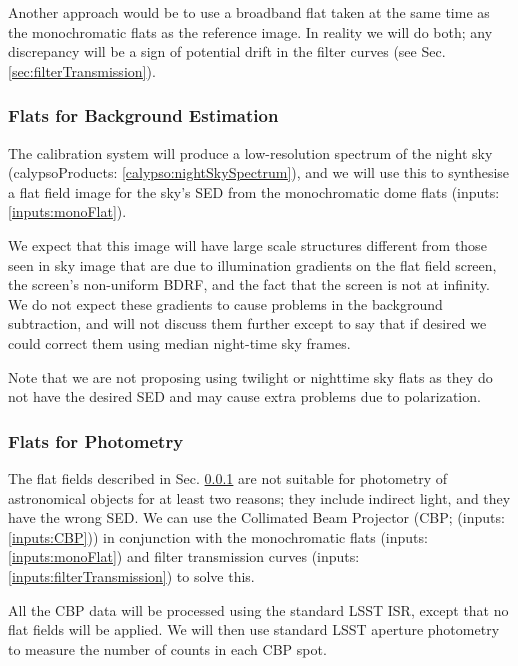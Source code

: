 \documentclass[12pt]{article}
\newcommand{\inputData}[1]{(inputs: \ref{inputs:#1})}
\newcommand{\calypsoData}[1]{(calypsoProducts: \ref{calypso:#1})}
\newcommand{\secRef}[1]{Sec. \ref{sec:#1}}
\begin{document}
Another approach would be to use a broadband flat taken at the same time as the monochromatic flats
as the reference image.  In reality we will do both;  any discrepancy will be a sign of potential
drift in the filter curves (see \secRef{filterTransmission}).

\subsubsection{Flats for Background Estimation}
\label{sec:backgroundFlats}

The calibration system will produce a low-resolution spectrum of the night sky \calypsoData{nightSkySpectrum},
and we will use this to synthesise a flat field image for the sky's SED from the monochromatic dome flats
\inputData{monoFlat}.

We expect that this image will have large scale structures different from those seen in sky image
that are due to illumination gradients on the flat field screen, the screen's non-uniform BDRF, and
the fact that the screen is not at infinity.  We do not expect these gradients to cause problems in
the background subtraction, and will not discuss them further except to say that if desired we could
correct them using median night-time sky frames.

Note that we are not proposing using twilight or nighttime sky flats as they do not have the desired
SED and may cause extra problems due to polarization.

\subsubsection{Flats for Photometry}
\label{sec:photometricFlats}

The flat fields described in \secRef{backgroundFlats} are not suitable for photometry of astronomical
objects for at least two reasons;  they include indirect light, and they have the wrong SED.  We can
use the Collimated Beam Projector (CBP; \inputData{CBP}) in conjunction with the monochromatic flats
\inputData{monoFlat} and filter transmission curves \inputData{filterTransmission} to solve this.

All the CBP data will be processed using the standard LSST ISR, except that no flat fields will be applied.
We will then use standard LSST aperture photometry to measure the number of counts in each CBP spot.
\end{document}

